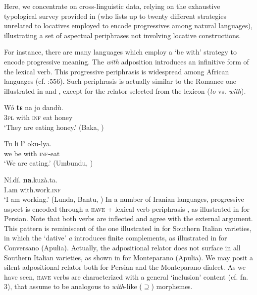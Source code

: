 \documentclass[output=paper,modfonts,nonflat,newtxmath,colorlinks,citecolor=brown]{langsci/langscibook}
\begin{document}
Here, we concentrate on cross-linguistic data, relying on the exhaustive typological survey provided in \citet{Cinque2017} (who lists up to twenty different strategies unrelated to locatives employed to encode progressives among natural languages), illustrating a set of aspectual periphrases not involving locative constructions. 

For instance, there are many languages which employ a ‘be with’ strategy to encode progressive meaning. The \textit{with} adposition introduces an infinitive form of the lexical verb. This progressive periphrasis is widespread among African languages (cf. \citealt{Cinque2017}:556). Such periphrasis is actually similar to the Romance one illustrated in  and , except for the relator selected from the lexicon (\textit{to} vs. \textit{with}).

\ea%
    \label{ex:franco:12}
    \gll Wó  \textbf{tε}   na   jo   dandù.\\
        3\textsc{pl}  with   \textsc{inf}   eat   honey\\
    \glt ‘They are eating honey.’   (Baka, \citealt[29]{Kilian-Hatz1992})
    \z

\ea%
    \label{ex:franco:13}
    \gll Tu   li   \textbf{l’}   oku-lya. \\
        we  be  with  \textsc{inf}-eat\\
    \glt ‘We are eating.’  (Umbundu, \citealt[83]{HeineKuteva2002})
    \z

\ea%
    \label{ex:franco:14}
    \gll Ní.dí.   \textbf{na}.kuzà.ta.\\
        I.am  with.work.\textsc{inf}  \\
    \glt ‘I am working.’    (Lunda, Bantu, \citealt[194]{Kawasha2003})
    \z
In a number of Iranian languages, progressive aspect is encoded through a \textsc{have} + lexical verb periphrasis \citep[556]{Cinque2017}, as illustrated in  for Persian. Note that both verbs are inflected and agree with the external argument. This pattern is reminiscent of the one illustrated in \citet{ManziniEtAl2017} for Southern Italian varieties, in which the ‘dative’ \textit{a} introduces finite complements, as illustrated in  for Conversano (Apulia). Actually, the adpositional relator does not surface in all Southern Italian varieties, as shown in  for Monteparano (Apulia). We may posit a silent adpositional relator \citep{Kayne2003} both for Persian and the Monteparano dialect. As we have seen, \textsc{have} verbs are characterized with a general ‘inclusion’ content (cf. fn. 3), that \citet{ManziniFranco2016} assume to be analogous to \textit{with}{}-like (${\supseteq}$) morphemes.
\end{document}
